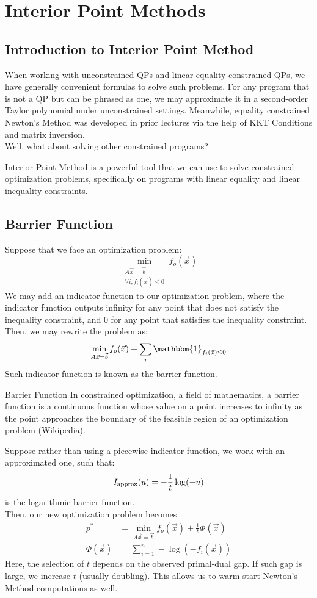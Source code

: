 \chapter{Interior Point Methods}

\section{Introduction to Interior Point Method}
When working with unconstrained QPs and linear equality constrained QPs, we have generally convenient formulas to solve such problems.
For any program that is not a QP but can be phrased as one, we may approximate it in a second-order Taylor polynomial under unconstrained settings.
Meanwhile, equality constrained Newton's Method was developed in prior lectures via the help of KKT Conditions and matrix inversion. \\
Well, what about solving other constrained programs?

Interior Point Method is a powerful tool that we can use to solve constrained optimization problems, specifically on programs with linear equality and linear inequality constraints. \\

\section{Barrier Function}
Suppose that we face an optimization problem:
\[
    \min_{
        \substack{
            A \vec{x} = \vec{b} \\
            \forall i, f_i(\vec{x}) \leq 0
        }
    } f_o (\vec{x})
\]
We may add an indicator function to our optimization problem, where the indicator function outputs infinity for any point that does not satisfy the inequality constraint, and $0$ for any point that satisfies the inequality constraint. \\
Then, we may rewrite the problem as:
\[
    \min_{
        A \vec{x} = \vec{b}
    } f_o (\vec{x}) + \sum_i \mathbbm{1}_{f_i(\vec{x}) \leq 0}
\]
Such indicator function is known as the barrier function.
\begin{ln-define}{Barrier Function}{}
    In constrained optimization, a field of mathematics, a barrier function is a continuous function whose value on a point increases to infinity as the point approaches the boundary of the feasible region of an optimization problem
    (\href{https://en.wikipedia.org/wiki/Barrier_function}{Wikipedia}).
\end{ln-define}
Suppose rather than using a piecewise indicator function, we work with an approximated one, such that:
\[
    I_{\rm approx} (u) = -\frac{1}{t} \log(-u)
\]
is the logarithmic barrier function. \\
Then, our new optimization problem becomes
\begin{align*}
    p^* &= \min_{
        A \vec{x} = \vec{b}
    } f_o (\vec{x}) + \frac{1}{t} \Phi(\vec{x}) \\
    \Phi(\vec{x}) &= \sum_{i = 1}^n -\log(-f_i(\vec{x}))
\end{align*}
Here, the selection of $t$ depends on the observed primal-dual gap.
If such gap is large, we increase $t$ (usually doubling). This allows us to warm-start Newton's Method computations as well.
